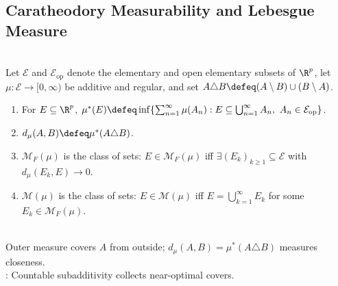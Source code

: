 \subsection{Caratheodory Measurability and Lebesgue Measure}

\begin{definition} \label{def:outer-measure-and-rudin-measurable-sets} \\
Let $\mathcal{E}$ and $\mathcal{E}_{\mathrm{op}}$ denote the elementary and open elementary subsets of $\R^p$, let $\mu:\mathcal{E}\to[0,\infty)$ be additive and regular, and set $A\triangle B\defeq(A\setminus B)\cup(B\setminus A)$.
\begin{enumerate}[label=(\roman*)]
\setlength{\itemsep}{0pt}
\item For $E\subseteq\R^p$, $\mu^\ast(E)\defeq\inf\{\sum_{n=1}^{\infty}\mu(A_n):E\subseteq\bigcup_{n=1}^{\infty}A_n,\ A_n\in\mathcal{E}_{\mathrm{op}}\}$.
\item $d_\mu(A,B)\defeq\mu^\ast(A\triangle B)$.
\item $\mathcal{M}_F(\mu)$ is the class of  sets: $E\in\mathcal{M}_F(\mu)$ iff $\exists(E_k)_{k\geq1}\subseteq\mathcal{E}$ with $d_\mu(E_k,E)\to0$.
\item $\mathcal{M}(\mu)$ is the class of  sets: $E\in\mathcal{M}(\mu)$ iff $E=\bigcup_{k=1}^{\infty}E_k$ for some $E_k\in\mathcal{M}_F(\mu)$.
\end{enumerate}
\end{definition}

\begin{perspective} \label{per:outer-measure-geometric-box-covers} \\
Outer measure covers $A$ from outside; $d_\mu(A,B)=\mu^\ast(A\triangle B)$ measures closeness.\\
: Countable subadditivity collects near-optimal covers.
\end{perspective}

